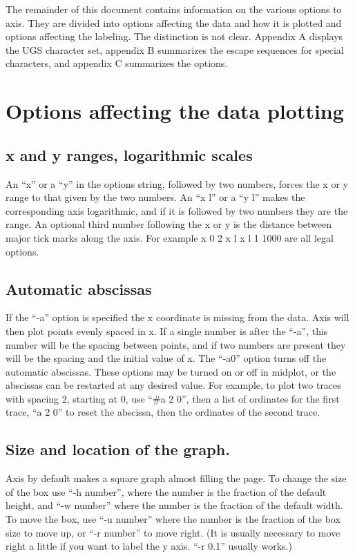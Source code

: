 The remainder of this document contains information on the various
options to axis.  They are divided into options affecting the data
and how it is plotted and options affecting the labeling.  The distinction
is not clear.  Appendix A displays the UGS character set, appendix
B summarizes the escape sequences for special characters, and appendix
C summarizes the options.

\section{Options affecting the data plotting}
\subsection{x and y ranges, logarithmic scales}
An ``x'' or a ``y'' in the options string, followed by two numbers, forces the
x or y range to that given by the two numbers.  An ``x l'' or a ``y l''
makes the corresponding axis logarithmic, and if it is followed
by two numbers they are the range.
An optional third number following the x or y is the distance
between major tick marks along the axis.
For example
\displaybegin
x 0 2
x l
x l 1 1000
\displayend
are all legal options.

\subsection{Automatic abscissas}
If the ``-a'' option is specified the x coordinate is missing from
the data.  Axis will then plot points evenly spaced in x.  If a single
number is after the ``-a'', this number will be the spacing between
points, and if two numbers are present they will be the spacing
and the initial value of x.
The ``-a0'' option turns off the automatic abscissas.
These options may be turned on or off in midplot, or the abscissas
can be restarted at any desired value.  For example, to plot two traces
with spacing 2, starting at 0, use ``\#a 2 0'', then a list of ordinates
for the first trace, ``a 2 0'' to reset the abscissa, then the ordinates
of the second trace.

\subsection{Size and location of the graph.}
Axis by default makes a square graph almost filling the page.
To change the size of the box use ``-h number'', where the number is
the fraction of the default height, and ``-w number'' where the number
is the fraction of the default width.
To move the box, use ``-u number'' where the number is the fraction
of the box size to move up, or ``-r number'' to move right.
(It is usually necessary to move right a little if you want to
label the y axis. ``-r 0.1'' usually works.)

